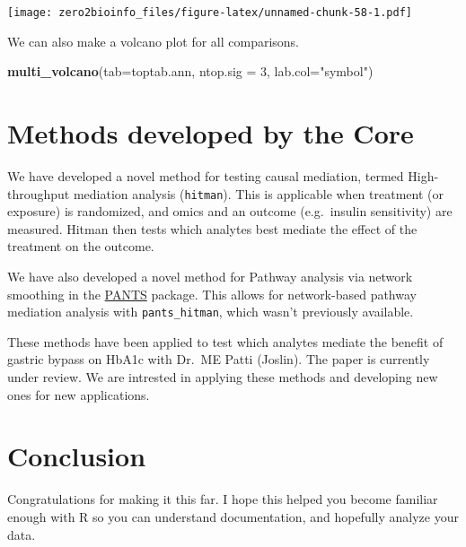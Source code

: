 \documentclass[]{article}
\newenvironment{Shaded}{\begin{snugshade}}{\end{snugshade}}
\newcommand{\KeywordTok}[1]{\textcolor[rgb]{0.13,0.29,0.53}{\textbf{#1}}}
\newcommand{\DataTypeTok}[1]{\textcolor[rgb]{0.13,0.29,0.53}{#1}}
\newcommand{\DecValTok}[1]{\textcolor[rgb]{0.00,0.00,0.81}{#1}}
\newcommand{\StringTok}[1]{\textcolor[rgb]{0.31,0.60,0.02}{#1}}
\newcommand{\NormalTok}[1]{#1}
\begin{document}
\texttt{[image: zero2bioinfo\_files/figure-latex/unnamed-chunk-58-1.pdf]}

We can also make a volcano plot for all comparisons.

\begin{Shaded}
\begin{Highlighting}[]
\KeywordTok{multi_volcano}\NormalTok{(}\DataTypeTok{tab=}\NormalTok{toptab.ann, }\DataTypeTok{ntop.sig =} \DecValTok{3}\NormalTok{, }\DataTypeTok{lab.col=}\StringTok{"symbol"}\NormalTok{)}
\end{Highlighting}
\end{Shaded}

\section{Methods developed by the
Core}\label{methods-developed-by-the-core}

We have developed a novel method for testing causal mediation, termed
High-throughput mediation analysis (\texttt{hitman}). This is applicable
when treatment (or exposure) is randomized, and omics and an outcome
(e.g.~insulin sensitivity) are measured. Hitman then tests which
analytes best mediate the effect of the treatment on the outcome.

We have also developed a novel method for Pathway analysis via network
smoothing in the \href{https://github.com/jdreyf/PANTS}{PANTS} package.
This allows for network-based pathway mediation analysis with
\texttt{pants\_hitman}, which wasn't previously available.

These methods have been applied to test which analytes mediate the
benefit of gastric bypass on HbA1c with Dr.~ME Patti (Joslin). The paper
is currently under review. We are intrested in applying these methods
and developing new ones for new applications.

\section{Conclusion}\label{conclusion}

Congratulations for making it this far. I hope this helped you become
familiar enough with R so you can understand documentation, and
hopefully analyze your data.
\end{document}
